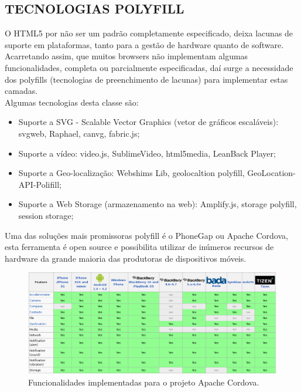 \documentclass{article}
\begin{document}
\subsection{TECNOLOGIAS POLYFILL}

O HTML5 por não ser um padrão completamente especificado, deixa lacunas de suporte em plataformas, tanto para a gestão de hardware quanto de software. Acarretando assim, que muitos browsers não implementam algumas funcionalidades, completa ou parcialmente especificadas, daí surge a necessidade dos polyfills (tecnologias de preenchimento de lacunas) para implementar estas camadas. 
\\
Algumas tecnologias desta classe são: 

\begin{itemize}
    \item Suporte a SVG - Scalable Vector Graphics (vetor de gráficos escaláveis): svgweb, Raphael, canvg, fabric.js; 

    \item Suporte a vídeo: video.js, SublimeVideo, html5media, LeanBack Player;

    \item Suporte a Geo-localização: Webshims Lib, geolocaltion polyfill, GeoLocation-API-Polifill; 

    \item Suporte a Web Storage (armazenamento na web): Amplify.js, storage polyfill, session storage; 
\end{itemize}

Uma das soluções mais promissoras polyfill é o PhoneGap ou Apache Cordova, esta ferramenta é open source e possibilita utilizar de inúmeros recursos de hardware da grande maioria das produtoras de dispositivos móveis. 


\begin{figure}[!htbp]
    \begin{center}
        \includegraphics[width=\textwidth]{asset/img/cordovaFeatures.jpg}
               \caption{Funcionalidades implementadas para o projeto Apache Cordova.\label{fig:Cordova}}
    \end{center}
\end{figure}
\end{document}
